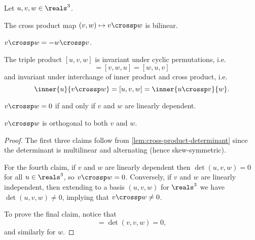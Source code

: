 \documentclass[article, a4paper, 11pt, oneside]{memoir}
\numberwithin{equation}{chapter}
\begin{document}
\begin{proposition}
    Let $u,v,w \in \reals^3$.
    \begin{enumprop}
        \item The cross product map $(v,w) \mapsto v \crossp w$ is bilinear.

        \item $v \crossp w = - w \crossp v$.

        \item The triple product $[u,v,w]$ is invariant under cyclic permutations, i.e.
        \begin{equation*}
            [u,v,w]
                = [v,w,u]
                = [w,u,v]
        \end{equation*}
        and invariant under interchange of inner product and cross product, i.e.
        \begin{equation*}
            \inner{u}{v \crossp w}
                = [u,v,w]
                = \inner{u \crossp v}{w}.
        \end{equation*}

        \item $v \crossp w = 0$ if and only if $v$ and $w$ are linearly dependent.

        \item $v \crossp w$ is orthogonal to both $v$ and $w$.
    \end{enumprop}
\end{proposition}

\begin{proof}
    The first three claims follow from \cref{lem:cross-product-determinant} since the determinant is multilinear and alternating (hence skew-symmetric).
    
    For the fourth claim, if $v$ and $w$ are linearly dependent then $\det(u,v,w) = 0$ for all $u \in \reals^3$, so $v \crossp w = 0$. Conversely, if $v$ and $w$ are linearly independent, then extending to a basis $(u,v,w)$ for $\reals^3$ we have $\det(u,v,w) \neq 0$, implying that $v \crossp w \neq 0$.

    To prove the final claim, notice that
    \begin{equation*}
        [v,v,w]
            = \det(v,v,w)
            = 0,
    \end{equation*}
    and similarly for $w$.
\end{proof}
\end{document}
